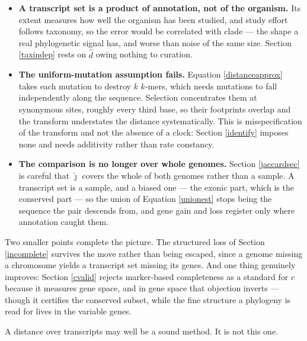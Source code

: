\documentclass[pdflatex,sn-vancouver-num]{sn-jnl}
\begin{document}
\begin{appendices}
\begin{itemize}
  \item \textbf{A transcript set is a product of annotation, not of the organism.} Its extent
    measures how well the organism has been studied, and study effort follows taxonomy, so the error
    would be correlated with clade --- the shape a real phylogenetic signal has, and worse than noise
    of the same size. Section \ref{taxindep} rests on $\widehat{d}$ owing nothing to curation.
  \item \textbf{The uniform-mutation assumption fails.} Equation \eqref{distanceapprox} takes each
    mutation to destroy $k$ $k$-mers, which needs mutations to fall independently along the sequence.
    Selection concentrates them at synonymous sites, roughly every third base, so their footprints
    overlap and the transform understates the distance systematically. This is misspecification of the
    transform and not the absence of a clock: Section \ref{identify} imposes none and needs additivity
    rather than rate constancy.
  \item \textbf{The comparison is no longer over whole genomes.} Section \ref{jaccardsec} is careful
    that $\widehat{\jmath}$ covers the whole of both genomes rather than a sample. A transcript set is
    a sample, and a biased one --- the exonic part, which is the conserved part --- so the union of
    Equation \eqref{unionest} stops being the sequence the pair descends from, and gene gain and loss
    register only where annotation caught them.
\end{itemize}

\noindent
Two smaller points complete the picture. The structured loss of Section \ref{incomplete} survives the
move rather than being escaped, since a genome missing a chromosome yields a transcript set missing
its genes. And one thing genuinely improves: Section \ref{cvalid} rejects marker-based completeness as
a standard for $c$ because it measures gene space, and in gene space that objection inverts --- though
it certifies the conserved subset, while the fine structure a phylogeny is read for lives in the
variable genes.

A distance over transcripts may well be a sound method. It is not this one.

\end{appendices}

\clearpage


\end{document}
